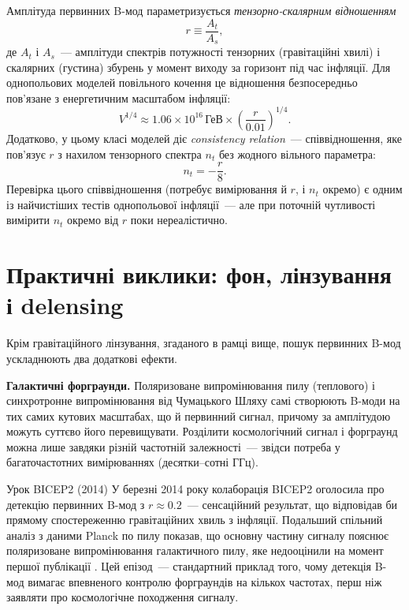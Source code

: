 Амплітуда первинних B-мод параметризується \emph{тензорно-скалярним
відношенням}
\begin{equation}\label{eq:r_def}
    r \equiv \frac{A_t}{A_s},
\end{equation}
де $A_t$ і $A_s$~--- амплітуди спектрів потужності тензорних (гравітаційні
хвилі) і скалярних (густина) збурень у момент виходу за горизонт під
час інфляції. Для однопольових моделей повільного кочення це відношення
безпосередньо пов'язане з енергетичним масштабом інфляції:
\begin{equation}\label{eq:r_energy_scale}
    V^{1/4} \approx 1.06\times10^{16}\,\text{ГеВ}\times\left(\frac{r}{0.01}\right)^{1/4}.
\end{equation}
Додатково, у цьому класі моделей діє \emph{consistency relation}~---
співвідношення, яке пов'язує $r$ з нахилом тензорного спектра $n_t$
без жодного вільного параметра:
\begin{equation}\label{eq:consistency_relation}
    n_t = -\frac{r}{8}.
\end{equation}
Перевірка цього співвідношення (потребує вимірювання й $r$, і $n_t$
окремо) є одним із найчистіших тестів однопольової інфляції~---
але при поточній чутливості вимірити $n_t$ окремо від $r$ поки
нереалістично.

\section{Практичні виклики: фон, лінзування і delensing}
\label{subsec:foregrounds}

Крім гравітаційного лінзування, згаданого в рамці вище, пошук
первинних B-мод ускладнюють два додаткові ефекти.

\textbf{Галактичні форграунди.} Поляризоване випромінювання пилу
(теплового) і синхротронне випромінювання від Чумацького Шляху
самі створюють B-моди на тих самих кутових масштабах, що й
первинний сигнал, причому за амплітудою можуть суттєво його
перевищувати. Розділити космологічний сигнал і форграунд можна лише
завдяки різній частотній залежності~--- звідси потреба у
багаточастотних вимірюваннях (десятки--сотні ГГц).

\begin{keybox}{Урок BICEP2 (2014)}
У березні 2014 року колаборація BICEP2 оголосила про детекцію
первинних B-мод з $r \approx 0.2$~--- сенсаційний результат, що
відповідав би прямому спостереженню гравітаційних хвиль з інфляції.
Подальший спільний аналіз з даними Planck по пилу показав, що
основну частину сигналу пояснює поляризоване випромінювання
галактичного пилу, яке недооцінили на момент першої публікації
\cite{bicep2_2014, planck_bicep2_joint_2015}. Цей епізод~--- стандартний
приклад того, чому детекція B-мод вимагає впевненого контролю
форграундів на кількох частотах, перш ніж заявляти про
космологічне походження сигналу.
\end{keybox}

